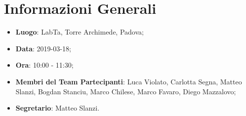 \section{Informazioni Generali}
\begin{itemize}
	\item \textbf{Luogo}: LabTa, Torre Archimede, Padova; 
	\item \textbf{Data}: 2019-03-18;
	\item \textbf{Ora}: 10:00 - 11:30;
	\item \textbf{Membri del Team Partecipanti}: Luca Violato, Carlotta Segna, Matteo Slanzi, Bogdan Stanciu, Marco Chilese, Marco Favaro, Diego Mazzalovo; 
	\item \textbf{Segretario}: Matteo Slanzi. 
\end{itemize}


